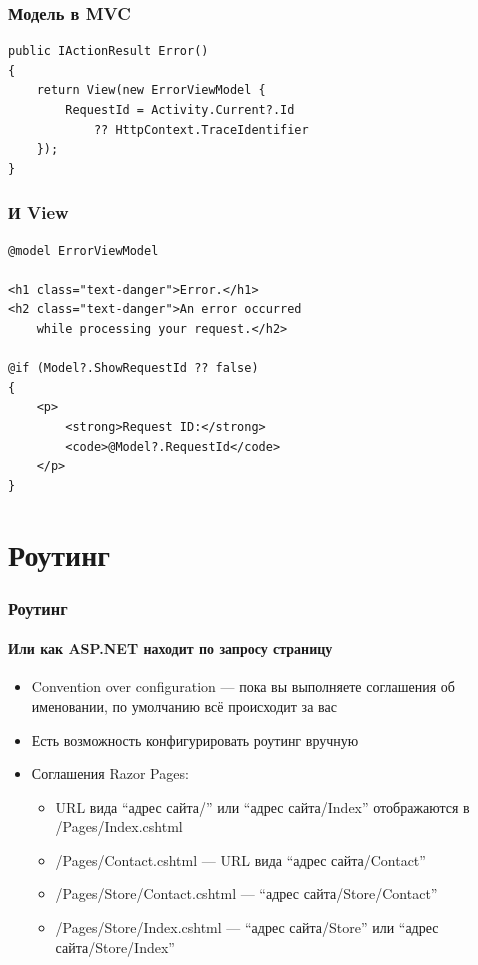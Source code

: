 \documentclass[xetex,mathserif,serif]{beamer}
\begin{document}
    \begin{frame}[fragile]
        \frametitle{Модель в MVC}
        \begin{verbatim}
public IActionResult Error()
{
    return View(new ErrorViewModel { 
        RequestId = Activity.Current?.Id 
            ?? HttpContext.TraceIdentifier 
    });
}
        \end{verbatim}
    \end{frame}

    \begin{frame}[fragile]
        \frametitle{И View}
        \begin{verbatim}
@model ErrorViewModel

<h1 class="text-danger">Error.</h1>
<h2 class="text-danger">An error occurred 
    while processing your request.</h2>

@if (Model?.ShowRequestId ?? false)
{
    <p>
        <strong>Request ID:</strong> 
        <code>@Model?.RequestId</code>
    </p>
}
        \end{verbatim}
    \end{frame}

    \section{Роутинг}

    \begin{frame}
        \frametitle{Роутинг}
        \framesubtitle{Или как ASP.NET находит по запросу страницу}
        \begin{itemize}
            \item Convention over configuration --- пока вы выполняете соглашения об именовании, по умолчанию всё происходит за вас
            \item Есть возможность конфигурировать роутинг вручную
            \item Соглашения Razor Pages:
            \begin{itemize}
                \item URL вида ``адрес сайта/'' или ``адрес сайта/Index'' отображаются в /Pages/Index.cshtml
                \item /Pages/Contact.cshtml --- URL вида ``адрес сайта/Contact''
                \item /Pages/Store/Contact.cshtml --- ``адрес сайта/Store/Contact''
                \item /Pages/Store/Index.cshtml --- ``адрес сайта/Store'' или ``адрес сайта/Store/Index''
            \end{itemize}
        \end{itemize}
    \end{frame}
\end{document}
